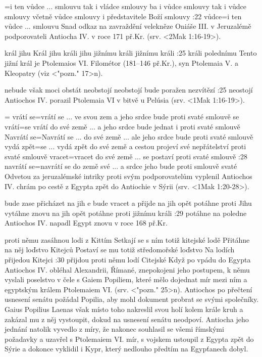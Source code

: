 ={i ten vůdce ...  smlouvu}   %
    {tak i vládce smlouvy}   %
    {ba i vůdce smlouvy}   %
    {tak i vůdce smlouvy}   %
    {včetně vůdce smlouvy}   %
    {i představitele Boží smlouvy}   %
:22 {vůdce}={i ten vůdce ... smlouvu} %
        Snad odkaz na zavraždění velekněze Oniáše III. v Jeruzalémě podporovateli Antiocha IV. v roce 171 př.Kr. (srv. <2Mak 1:16-19>).
        
    {král jihu}   %
    {Král jihu}   %
    {králi jihu}   %
    {jižnímu králi}   %
    {jižnímu králi}   %
:25 {králi polednímu}
    Tento jižní král je Ptolemaios VI. Filométor (181--146 př.Kr.),  syn Ptolemaia V. a Kleopatry (viz <"pozn." 17>n).

    {nebude však moci obstát}   %
    {neobstojí}   %
    {neobstojí}   %
    {bude poražen}   %
    {nezvítězí}  %
:25 {neostojí}
    Antiochos IV. porazil Ptolemaia VI v bitvě u Pelúsia (srv. <1Mak 1:16-19>).

={}   %
    {vrátí se}={vrátí se ... ve svou zem a jeho srdce bude proti svaté smlouvě}   %
    {se vrátí}={se vrátí do své země ... a jeho srdce bude jednat i proti svaté smlouvě}   %
    {Navrátí se}={Navrátí se ... do své země ... ale jeho srdce bude proti svaté smlouvě}   %
    {vydá zpět}={se ... vydá zpět do své země a cestou projeví své nepřátelství proti svaté smlouvě}   %
    {vracet}={vracet do své země ... se postaví proti svaté smlouvě}   %
:28 {navrátí se}={navrátí se do země své ... a srdce jeho bude proti smlouvě svaté}
    Odvetou za jeruzalémské intriky proti svým podporovatelům vyplenil Antiochos IV. chrám po cestě z Egypta zpět do  Antiochie v Sýrii (srv. <1Mak 1:20-28>). 

    {bude zase přicházet na jih}   %
    {e bude vracet a přijde na jih}   %
    {opět potáhne proti Jihu}   %
    {vytáhne znovu na jih}  %
    {opět potáhne proti jižnímu králi}   %
:29 {potáhne na poledne}
    Antiochos IV. napadl Egypt znovu v roce 168 př.Kr.
    
    {proti němu zasáhnou lodi z Kittím}   %
    {Setkají se s ním totiž kitejské lodě}  %
    {Přitáhne na něj loďstvo Kitejců}   %
    {Postaví se mu totiž středomořské loďstvo}   %
    {Na lodích přijedou Kitejci}   %
:30 {přijdou proti němu lodí Citejské}
    Když po vpádu do Egypta Antiochos IV. obléhal Alexandrii,   Římané, znepokojeni jeho postupem, k němu vyslali poselstvo v čele s Gaiem Popiliem, které mělo dojednat mír mezi ním a egyptským králem Ptolemaiem VI. (srv. <"pozn." 25>n). Antiochos po přečtení usnesení senátu požádal Popilia, aby mohl dokument probrat se svými společníky. Gaius Popilius Laenas však místo toho nakreslil svou holí kolem krále kruh a zakázal mu z něj vystoupit, dokud na usnesení senátu neodpoví. Antiocha jeho jednání natolik vyvedlo z míry, že nakonec souhlasil se všemi římskými požadavky a uzavřel s Ptolemaiem VI. mír, s vojskem ustoupil z Egypta zpět do Sýrie a dokonce vyklidil i Kypr, který nedlouho předtím na Egypťanech dobyl.
    
